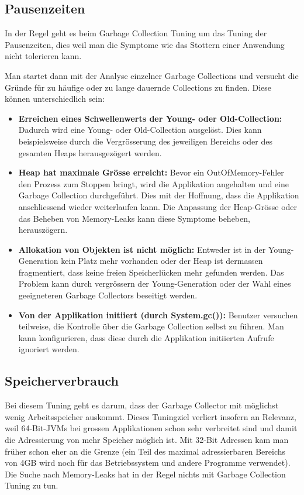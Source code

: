 \subsection{Pausenzeiten\label{gc_tuning_pausenzeiten}}
In der Regel geht es beim Garbage Collection Tuning um das Tuning der Pausenzeiten, dies weil man die Symptome wie das Stottern einer Anwendung nicht tolerieren kann. 

Man startet dann mit der Analyse einzelner Garbage Collections und versucht die Gründe für zu häufige oder zu lange dauernde Collections zu finden. Diese können unterschiedlich sein:
\begin{itemize}
\item \textbf{Erreichen eines Schwellenwerts der Young- oder Old-Collection:} Dadurch wird eine Young- oder Old-Collection ausgelöst. Dies kann beispielsweise durch die Vergrösserung des jeweiligen Bereichs oder des gesamten Heaps herausgezögert werden.
\item \textbf{Heap hat maximale Grösse erreicht:} Bevor ein OutOfMemory-Fehler den Prozess zum Stoppen bringt, wird die Applikation angehalten und eine Garbage Collection durchgeführt. Dies mit der Hoffnung, dass die Applikation anschliessend wieder weiterlaufen kann. Die Anpassung der Heap-Grösse oder das Beheben von Memory-Leaks kann diese Symptome beheben, herauszögern.
\item \textbf{Allokation von Objekten ist nicht möglich:} Entweder ist in der Young-Generation kein Platz mehr vorhanden oder der Heap ist dermassen fragmentiert, dass keine freien Speicherlücken mehr gefunden werden. Das Problem kann durch vergrössern der Young-Generation oder der Wahl eines geeigneteren Garbage Collectors beseitigt werden.
\item \textbf{Von der Applikation initiiert (durch System.gc()):} Benutzer versuchen teilweise, die Kontrolle über die Garbage Collection selbst zu führen. Man kann konfigurieren, dass diese durch die Applikation initiierten Aufrufe ignoriert werden.
\end{itemize}



\subsection{Speicherverbrauch\label{gc_tuning_speicherverbrauch}}
Bei diesem Tuning geht es darum, dass der Garbage Collector mit möglichst wenig Arbeitsspeicher auskommt.
Dieses Tuningziel verliert insofern an Relevanz, weil 64-Bit-JVMs bei grossen Applikationen schon sehr verbreitet sind und damit die Adressierung von mehr Speicher möglich ist. Mit 32-Bit Adressen kam man früher schon eher an die Grenze (ein Teil des maximal adressierbaren Bereichs von 4GB wird noch für das Betriebssystem und andere Programme verwendet). Die Suche nach Memory-Leaks hat in der Regel nichts mit Garbage Collection Tuning zu tun.


